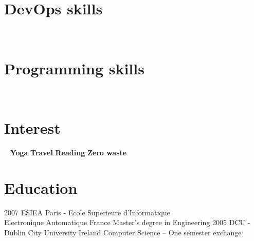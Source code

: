 \documentclass[]{friggeri-cv}
\begin{document}
\begin{aside}
~
~
~
\section{DevOps skills}
~  
~  
\section{Programming skills}
~  
    ~
   	\section{Interest}
   	~  
    	\textbf{Yoga}
    	\textbf{Travel} 
    	\textbf{Reading} 
    	\textbf{Zero waste}        	
    	~
\end{aside}
\section{Education}
\begin{entrylist}
	\entry
	{2007}
	{ESIEA Paris - Ecole Supérieure d’Informatique \\  Electronique Automatique}
	{France}
	{Master's degree in Engineering}
	\entry
	{2005}
	{DCU - Dublin City University}
	{Ireland}
	{Computer Science – One semester exchange}	
\end{entrylist}
\end{document}
